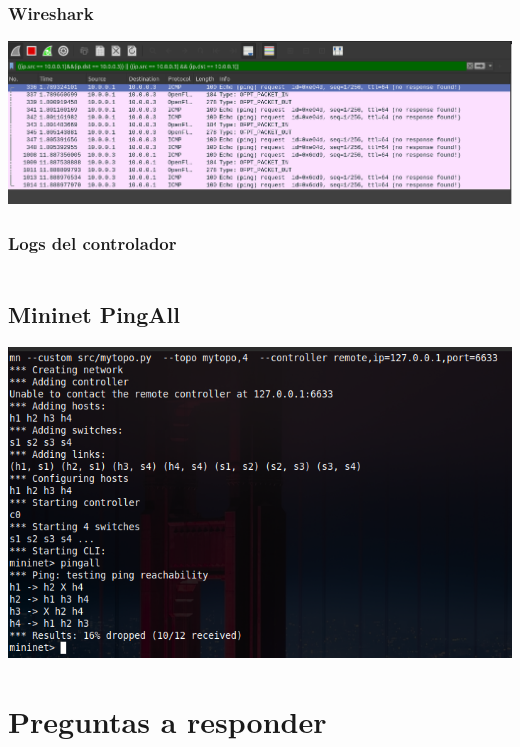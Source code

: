 \documentclass{article}
\begin{document}
\subsubsection{Wireshark}
\begin{center}
\includegraphics[scale=0.35]{Banned_Tuple_WS.png}
\end{center}


\subsubsection{Logs del controlador}
\begin{center}
  \inputminted[fontsize=\footnotesize]{text}{informe/logs/Banned_Tuple_Log.txt}
\end{center}


\subsection{Mininet PingAll}
\begin{center}
  \includegraphics[scale=0.35]{Mininet_Banned_Tupled.png}
\end{center}

\section{Preguntas a responder}\label{preguntas-a-responder}
\end{document}
